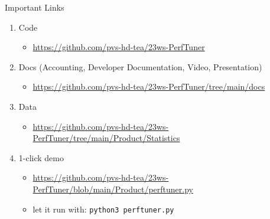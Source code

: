 \documentclass{beamer}
\begin{document}
\begin{frame}{Important Links}
    \begin{enumerate}
        
        \item Code
        \begin{itemize}
            \item \footnotesize \textcolor{magenta}{\url{https://github.com/pvs-hd-tea/23ws-PerfTuner}}
        \end{itemize}
        
        \vspace{0.3cm}
        
        \item Docs (Accounting, Developer Documentation, Video, Presentation)
        \begin{itemize}
            \item \footnotesize \textcolor{magenta}{\url{https://github.com/pvs-hd-tea/23ws-PerfTuner/tree/main/docs}}
        \end{itemize}
        
        \vspace{0.3cm}
        
        \item Data
        \begin{itemize}
            \item \footnotesize \textcolor{magenta}{\url{https://github.com/pvs-hd-tea/23ws-PerfTuner/tree/main/Product/Statistics}}
        \end{itemize}
        
        \vspace{0.3cm}
         
        \item 1-click demo
        \begin{itemize}
            \item \footnotesize \textcolor{magenta}{\url{https://github.com/pvs-hd-tea/23ws-PerfTuner/blob/main/Product/perftuner.py}}
            \item \footnotesize let it run with: \texttt{python3 perftuner.py}
        \end{itemize}
    
    \end{enumerate}
\end{frame}
\end{document}
